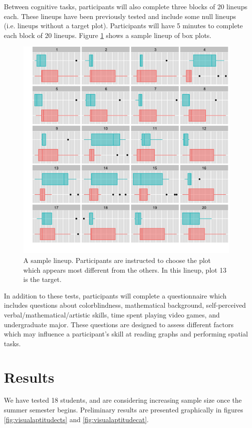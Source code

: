 \documentclass[11pt]{isuthesis}\usepackage[]{graphicx}\usepackage[]{color}
\begin{document}
Between cognitive tasks, participants will also complete three blocks of 20 lineups each. These lineups have been previously tested \citep{hofmann2012graphical} and include some null lineups (i.e. lineups without a target plot). Participants will have 5 minutes to complete each block of 20 lineups. Figure \ref{fig:lineup} shows a sample lineup of box plots. 

\begin{figure}[htbp]\centering
\includegraphics[width=.9\textwidth]{lineup}
\caption[Sample Lineup]{A sample lineup. Participants are instructed to choose the plot which appears most different from the others. In this lineup, plot 13 is the target. }\label{fig:lineup}
\end{figure}

In addition to these tests, participants will complete a questionnaire which includes questions about colorblindness, mathematical background, self-perceived verbal/mathematical/artistic skills, time spent playing video games, and undergraduate major. These questions are designed to assess different factors which may influence a participant's skill at reading graphs and performing spatial tasks. 

\section{Results}
We have tested 18 students, and are considering increasing sample size once the summer semester begins. Preliminary results are presented graphically in figures \ref{fig:visualaptitudects} and \ref{fig:visualaptitudecat}.
\end{document}
